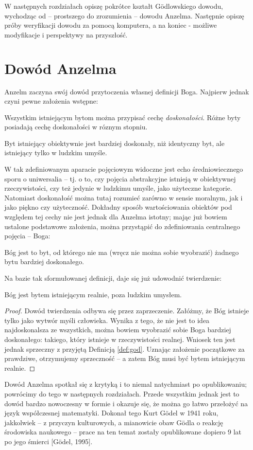 \documentclass[12pt]{article}
\begin{document}
\begin{multicols}{2}
W następnych rozdziałach opiszę pokrótce kształt G\"odlowskiego dowodu, wychodząc od -- prostszego do zrozumienia -- dowodu Anzelma. Następnie opiszę próby weryfikacji dowodu za pomocą komputera, a na koniec - możliwe modyfikacje i perspektywy na przyszłość. 

\section{Dowód Anzelma}
Anzelm zaczyna swój dowód przytoczenia własnej definicji Boga. Najpierw jednak czyni pewne założenia wstępne: 
\begin{axiom} \label{axiom:1}
	Wszystkim istniejącym bytom można przypisać cechę \emph{doskonałości}. Różne byty posiadają cechę doskonałości w róznym stopniu. 
\end{axiom}
\begin{axiom} \label{axiom:2}
	Byt istniejący obiektywnie jest bardziej doskonały, niż identyczny byt, ale istniejący tylko w ludzkim umyśle. 
\end{axiom}
W tak zdefiniowanym aparacie pojęciowym widoczne jest echo średniowiecznego sporu o uniwersalia -- tj. o to, czy pojęcia abstrakcyjne istnieją w obiektywnej rzeczywistości, czy też jedynie w ludzkimu umyśle, jako użyteczne kategorie. Natomiast doskonałość można tutaj rozumieć zarówno w sensie moralnym, jak i jako piękno czy użyteczność. Dokładny sposób wartościowania obiektów pod względem tej cechy nie jest jednak dla Anzelma istotny; mając już bowiem ustalone podstawowe założenia, można przystąpić do zdefiniowania centralnego pojęcia -- Boga:
\begin{definition} \label{def:god}
	Bóg jest to byt, od którego nie ma (wręcz nie można sobie wyobrazić) żadnego bytu bardziej doskonałego. 
\end{definition}
Na bazie tak sformułowanej definicji, daje się już udowodnić twierdzenie:
\begin{theorem} \label{theorem:god}
	Bóg jest bytem istniejącym realnie, poza ludzkim umysłem. 
\end{theorem}
\begin{proof}
	Dowód twierdzenia odbywa się przez zaprzeczenie. Załóżmy, że Bóg istnieje tylko jako wytwór myśli człowieka. Wynika z tego, że nie jest to idea najdoskonalsza ze wszystkich, można bowiem wyobrazić sobie Boga bardziej doskonałego: takiego, który istnieje w rzeczywistości realnej. Wniosek ten jest jednak sprzeczny z przyjętą Definicją \ref{def:god}. Uznając założenie początkowe za prawdziwe, otrzymujemy sprzeczność -- a zatem Bóg musi być bytem istniejącym realnie. 
\end{proof}
Dowód Anzelma spotkał się z krytyką i to niemal natychmiast po opublikowaniu; powrócimy do tego w następnych rozdziałach. Przede wszystkim jednak jest to dowód bardzo nowoczesny w formie i okazuje się, że można go łatwo przełożyć na język współczesnej matematyki. Dokonał tego Kurt G\"odel w 1941 roku, jakkolwiek -- z przyczyn kulturowych, a mianowicie obaw G\"odla o reakcję środowiska naukowego -- prace na ten temat zostały opublikowane dopiero 9 lat po jego śmierci [G\"odel, 1995]. 


\end{multicols}
\end{document}
